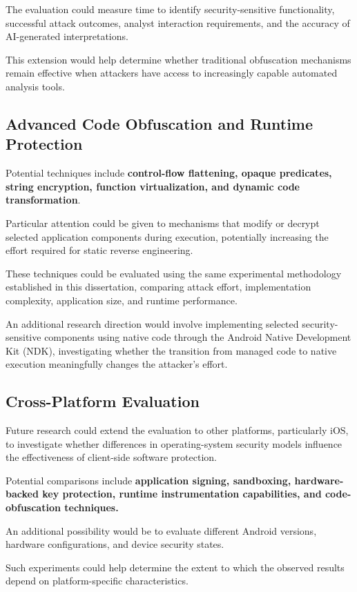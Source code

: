 \documentclass{article}
\begin{document}
The evaluation could measure time to identify security-sensitive functionality, successful attack outcomes, analyst interaction requirements, and the accuracy of AI-generated interpretations.

This extension would help determine whether traditional obfuscation mechanisms remain effective when attackers have access to increasingly capable automated analysis tools.


\subsection{Advanced Code Obfuscation and Runtime Protection}

Potential techniques include \textbf{control-flow flattening, opaque predicates, string encryption, function virtualization, and dynamic code transformation}.

Particular attention could be given to mechanisms that modify or decrypt selected application components during execution, potentially increasing the effort required for static reverse engineering.

These techniques could be evaluated using the same experimental methodology established in this dissertation, comparing attack effort, implementation complexity, application size, and runtime performance.

An additional research direction would involve implementing selected security-sensitive components using native code through the Android Native Development Kit (NDK), investigating whether the transition from managed code to native execution meaningfully changes the attacker's effort.

\subsection{Cross-Platform Evaluation}

Future research could extend the evaluation to other platforms, particularly iOS, to investigate whether differences in operating-system security models influence the effectiveness of client-side software protection.

Potential comparisons include \textbf{application signing, sandboxing, hardware-backed key protection, runtime instrumentation capabilities, and code-obfuscation techniques.}

An additional possibility would be to evaluate different Android versions, hardware configurations, and device security states.

Such experiments could help determine the extent to which the observed results depend on platform-specific characteristics.
\end{document}

